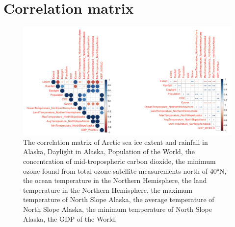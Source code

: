 \section{Correlation matrix} %

\begin{figure}[htbp]
\centering
\includegraphics[width = 1.0\textwidth]{Figure/4.1-CM.png}
\caption{The correlation matrix of Arctic sea ice extent and rainfall in Alaska, Daylight in Alaska, Population of the World, the concentration of mid-tropospheric carbon dioxide, the minimum ozone found from total ozone satellite measurements north of 40°N, the ocean temperature in the Northern Hemisphere, the land temperature in the Northern Hemisphere, the maximum temperature of North Slope Alaska, the average temperature of North Slope Alaska, the minimum temperature of North Slope Alaska, the GDP of the World.}
\label{4.1-CM}
\end{figure}
